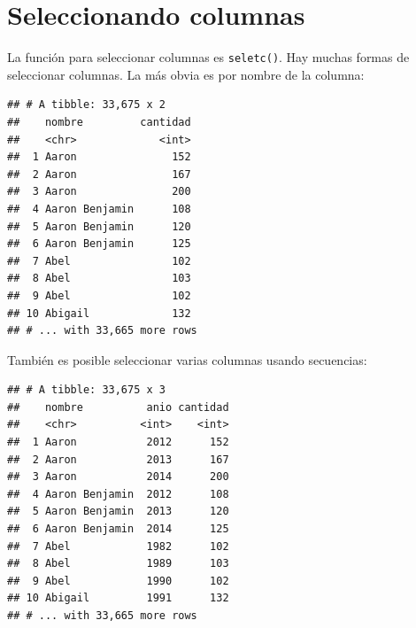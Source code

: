 \documentclass[]{book}
\newenvironment{Shaded}{\begin{snugshade}}{\end{snugshade}}
\newcommand{\KeywordTok}[1]{\textcolor[rgb]{0.13,0.29,0.53}{\textbf{#1}}}
\newcommand{\NormalTok}[1]{#1}
\newcommand{\OperatorTok}[1]{\textcolor[rgb]{0.81,0.36,0.00}{\textbf{#1}}}
\newcommand{\StringTok}[1]{\textcolor[rgb]{0.31,0.60,0.02}{#1}}
\theoremstyle{definition}
\theoremstyle{definition}
\theoremstyle{definition}
\theoremstyle{remark}
\begin{document}
\hypertarget{seleccionando-columnas}{%
\section{Seleccionando columnas}\label{seleccionando-columnas}}

La función para seleccionar columnas es \texttt{seletc()}. Hay muchas
formas de seleccionar columnas. La más obvia es por nombre de la
columna:

\begin{Shaded}
\end{Shaded}

\begin{verbatim}
## # A tibble: 33,675 x 2
##    nombre         cantidad
##    <chr>             <int>
##  1 Aaron               152
##  2 Aaron               167
##  3 Aaron               200
##  4 Aaron Benjamin      108
##  5 Aaron Benjamin      120
##  6 Aaron Benjamin      125
##  7 Abel                102
##  8 Abel                103
##  9 Abel                102
## 10 Abigail             132
## # ... with 33,665 more rows
\end{verbatim}

También es posible seleccionar varias columnas usando secuencias:

\begin{Shaded}
\end{Shaded}

\begin{verbatim}
## # A tibble: 33,675 x 3
##    nombre          anio cantidad
##    <chr>          <int>    <int>
##  1 Aaron           2012      152
##  2 Aaron           2013      167
##  3 Aaron           2014      200
##  4 Aaron Benjamin  2012      108
##  5 Aaron Benjamin  2013      120
##  6 Aaron Benjamin  2014      125
##  7 Abel            1982      102
##  8 Abel            1989      103
##  9 Abel            1990      102
## 10 Abigail         1991      132
## # ... with 33,665 more rows
\end{verbatim}
\end{document}

